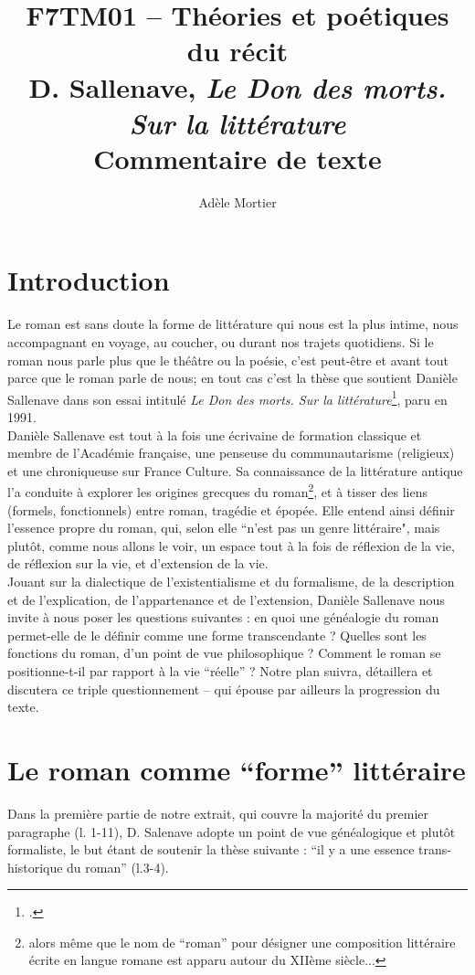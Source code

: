 \documentclass[a4paper,10pt]{article}
\title{F7TM01 -- Théories et poétiques du récit\\
	 D. Sallenave, \textit{Le Don des morts. Sur la littérature}\\ \vspace{0.3cm}
	 \small Commentaire de texte}
\author{Adèle Mortier}
\begin{document}
	\maketitle
	\nocite{*}
	\tableofcontents
	
	\section*{Introduction}
		Le roman est sans doute la forme de littérature qui nous est la plus intime, nous accompagnant en voyage, au coucher, ou durant nos trajets quotidiens. Si le roman nous parle plus que le théâtre ou la poésie, c'est peut-être et avant tout parce que le roman parle de nous; en tout cas c'est la thèse que soutient Danièle Sallenave dans son essai intitulé \textit{Le Don des morts. Sur la littérature}\footcite{Sallenave1991}, paru en 1991.\\
		Danièle Sallenave est tout à la fois une écrivaine de formation classique et membre de l'Académie française, une penseuse du communautarisme (religieux) et une chroniqueuse sur France Culture. Sa connaissance de la littérature antique l'a conduite à explorer les origines grecques du roman\footnote{alors même que le nom de ``roman'' pour désigner une composition littéraire écrite en langue romane est apparu autour du XIIème siècle...}, et à tisser des liens (formels, fonctionnels) entre roman, tragédie et épopée. Elle entend ainsi définir l'essence propre du roman, qui, selon elle ``n'est pas un genre littéraire", mais plutôt, comme nous allons le voir, un espace tout à la fois de réflexion de la vie, de réflexion sur la vie, et d'extension de la vie.\\
		Jouant sur la dialectique de l'existentialisme et du formalisme, de la description et de l'explication, de l'appartenance et de l'extension, Danièle Sallenave nous invite à nous poser les questions suivantes : en quoi une généalogie du roman permet-elle de le définir comme une forme transcendante ? Quelles sont les fonctions du roman, d'un point de vue philosophique ? Comment le roman se positionne-t-il par rapport à la vie ``réelle'' ? Notre plan suivra, détaillera et discutera ce triple questionnement -- qui épouse par ailleurs la progression du texte.
		
	\section{Le roman comme ``forme'' littéraire}
		Dans la première partie de notre extrait, qui couvre la majorité du premier paragraphe (l. 1-11), D. Salenave adopte un point de vue généalogique et plutôt formaliste, le but étant de soutenir la thèse suivante : ``il y a une essence trans-historique du roman'' (l.3-4).
\end{document}
